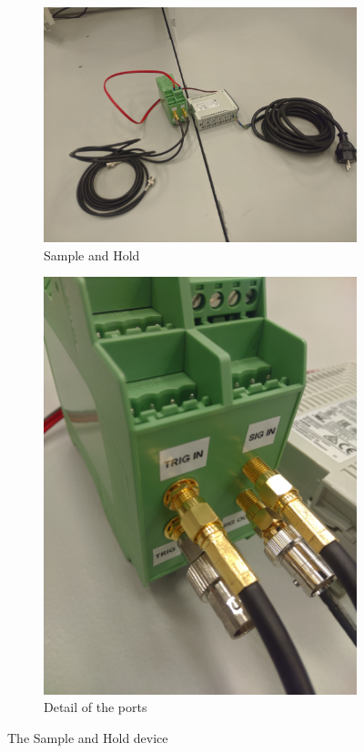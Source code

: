 \documentclass[a4paper, 10pt]{article}
\begin{document}
\begin{figure}[h]
    \centering
    \begin{subfigure}{0.4\textwidth}
        \includegraphics[width=\textwidth]{./images/sample-hold.jpg}
        \caption{Sample and Hold}
        \label{fig:sample-hold-overview}
    \end{subfigure}
    \begin{subfigure}{0.4\textwidth}
        \includegraphics[width=\textwidth]{./images/sample-hold-detail.jpg}
        \caption{Detail of the ports}
        \label{fig:sample-hold-detail}
    \end{subfigure}
    \caption{The Sample and Hold device}
    \label{fig:sample-hold}
\end{figure}
\end{document}
